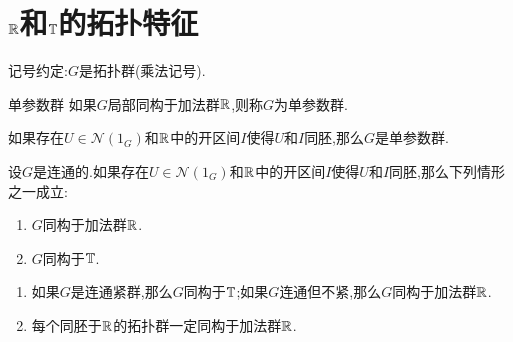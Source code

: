 \chapter{\texorpdfstring{$\mathbb{R}$}{R}和\texorpdfstring{$\mathbb{T}$}{T}的拓扑特征}

记号约定:$G$是拓扑群(乘法记号).

\begin{definition}{单参数群}{}
	如果$G$局部同构于加法群$\mathbb{R}$,则称$G$为单参数群.
\end{definition}

\begin{theorem}{}{}
	如果存在$U\in\mathcal{N}\left(1_{G}\right)$和$\mathbb{R}$中的开区间$I$使得$U$和$I$同胚,那么$G$是单参数群.
\end{theorem}

\begin{theorem}{}{}
	设$G$是连通的.如果存在$U\in\mathcal{N}\left(1_{G}\right)$和$\mathbb{R}$中的开区间$I$使得$U$和$I$同胚,那么下列情形之一成立:
	\begin{enumerate}
		\item $G$同构于加法群$\mathbb{R}$.
		\item $G$同构于$\mathbb{T}$.
	\end{enumerate}
\end{theorem}

\begin{remark}{}{}
	\begin{enumerate}
		\item 如果$G$是连通紧群,那么$G$同构于$\mathbb{T}$;如果$G$连通但不紧,那么$G$同构于加法群$\mathbb{R}$.
		\item 每个同胚于$\mathbb{R}$的拓扑群一定同构于加法群$\mathbb{R}$.
	\end{enumerate}
\end{remark}